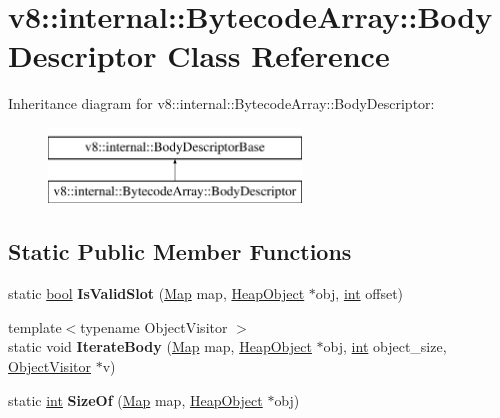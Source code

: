 \hypertarget{classv8_1_1internal_1_1BytecodeArray_1_1BodyDescriptor}{}\section{v8\+:\+:internal\+:\+:Bytecode\+Array\+:\+:Body\+Descriptor Class Reference}
\label{classv8_1_1internal_1_1BytecodeArray_1_1BodyDescriptor}
Inheritance diagram for v8\+:\+:internal\+:\+:Bytecode\+Array\+:\+:Body\+Descriptor\+:\begin{figure}[H]
\begin{center}
\leavevmode
\includegraphics[height=2.000000cm]{classv8_1_1internal_1_1BytecodeArray_1_1BodyDescriptor}
\end{center}
\end{figure}
\subsection*{Static Public Member Functions}
\begin{DoxyCompactItemize}
\item 
\mbox{\label{classv8_1_1internal_1_1BytecodeArray_1_1BodyDescriptor_aea4c13151cb559af1509714a58c4ad51}} 
static \mbox{\hyperlink{classbool}{bool}} {\bfseries Is\+Valid\+Slot} (\mbox{\hyperlink{classv8_1_1internal_1_1Map}{Map}} map, \mbox{\hyperlink{classv8_1_1internal_1_1HeapObject}{Heap\+Object}} $\ast$obj, \mbox{\hyperlink{classint}{int}} offset)
\item 
\mbox{\label{classv8_1_1internal_1_1BytecodeArray_1_1BodyDescriptor_adefc9e94d5565c572d6e4f7688795829}} 
{\footnotesize template$<$typename Object\+Visitor $>$ }\\static void {\bfseries Iterate\+Body} (\mbox{\hyperlink{classv8_1_1internal_1_1Map}{Map}} map, \mbox{\hyperlink{classv8_1_1internal_1_1HeapObject}{Heap\+Object}} $\ast$obj, \mbox{\hyperlink{classint}{int}} object\+\_\+size, \mbox{\hyperlink{classv8_1_1internal_1_1ObjectVisitor}{Object\+Visitor}} $\ast$v)
\item 
\mbox{\label{classv8_1_1internal_1_1BytecodeArray_1_1BodyDescriptor_a8206d8f5eb1e51684d09c4b9876ade94}} 
static \mbox{\hyperlink{classint}{int}} {\bfseries Size\+Of} (\mbox{\hyperlink{classv8_1_1internal_1_1Map}{Map}} map, \mbox{\hyperlink{classv8_1_1internal_1_1HeapObject}{Heap\+Object}} $\ast$obj)
\end{DoxyCompactItemize}
